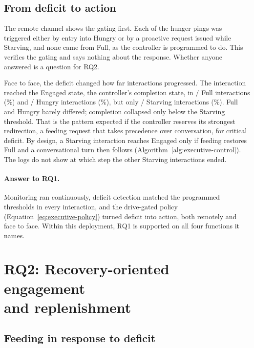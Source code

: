 \subsection{From deficit to action}

The remote channel shows the gating first. Each of the \CoreTelegramPings{} hunger pings was triggered either by entry into Hungry or by a proactive request issued while Starving, and none came from Full, as the controller is programmed to do. This verifies the gating and says nothing about the response. Whether anyone answered is a question for RQ2.

Face to face, the deficit changed how far interactions progressed. The interaction reached the Engaged state, the controller's completion state, in \CoreFullReachedSSFour{}/\CoreFullInteractions{} Full interactions (\CoreFullSSFourPercent{}\%) and \CoreHungryReachedSSFour{}/\CoreHungryInteractions{} Hungry interactions (\CoreHungrySSFourPercent{}\%), but only \CoreStarvingReachedSSFour{}/\CoreStarvingInteractions{} Starving interactions (\CoreStarvingSSFourPercent{}\%). Full and Hungry barely differed; completion collapsed only below the Starving threshold. That is the pattern expected if the controller reserves its strongest redirection, a feeding request that takes precedence over conversation, for critical deficit. By design, a Starving interaction reaches Engaged only if feeding restores Full and a conversational turn then follows (Algorithm~\ref{alg:executive-control}). The logs do not show at which step the other Starving interactions ended.

\paragraph{Answer to RQ1.} Monitoring ran continuously, deficit detection matched the programmed thresholds in every interaction, and the drive-gated policy (Equation~\ref{eq:executive-policy}) turned deficit into action, both remotely and face to face. Within this deployment, RQ1 is supported on all four functions it names.

\section[RQ2: Recovery-oriented engagement and replenishment]{RQ2: Recovery-oriented engagement\\and replenishment}
\label{subsec:results-rq2}

\subsection{Feeding in response to deficit}

